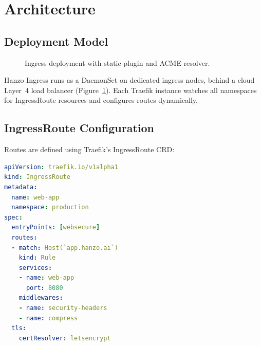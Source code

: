 \documentclass[11pt,twocolumn]{article}
\begin{document}
\section{Architecture}

\subsection{Deployment Model}

\begin{figure}[t]
\centering
{}
\caption{Ingress deployment with static plugin and ACME resolver.}
\label{fig:ingress}
\end{figure}

Hanzo Ingress runs as a DaemonSet on dedicated ingress nodes, behind a cloud Layer~4 load balancer (Figure~\ref{fig:ingress}). Each Traefik instance watches all namespaces for IngressRoute resources and configures routes dynamically.

\subsection{IngressRoute Configuration}

Routes are defined using Traefik's IngressRoute CRD:

\begin{lstlisting}[language=YAML]
apiVersion: traefik.io/v1alpha1
kind: IngressRoute
metadata:
  name: web-app
  namespace: production
spec:
  entryPoints: [websecure]
  routes:
  - match: Host(`app.hanzo.ai`)
    kind: Rule
    services:
    - name: web-app
      port: 8080
    middlewares:
    - name: security-headers
    - name: compress
  tls:
    certResolver: letsencrypt
\end{lstlisting}
\end{document}
